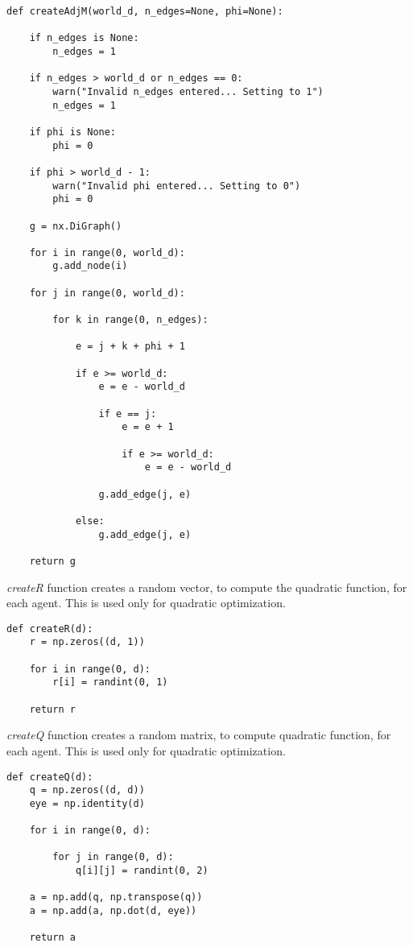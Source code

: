 \documentclass[a4paper,11pt,oneside]{book}
\begin{document}
\begin{lstlisting}
def createAdjM(world_d, n_edges=None, phi=None):

    if n_edges is None:
        n_edges = 1

    if n_edges > world_d or n_edges == 0:
        warn("Invalid n_edges entered... Setting to 1")
        n_edges = 1

    if phi is None:
        phi = 0

    if phi > world_d - 1:
        warn("Invalid phi entered... Setting to 0")
        phi = 0

    g = nx.DiGraph()

    for i in range(0, world_d):
        g.add_node(i)

    for j in range(0, world_d):

        for k in range(0, n_edges):

            e = j + k + phi + 1

            if e >= world_d:
                e = e - world_d

                if e == j:
                    e = e + 1

                    if e >= world_d:
                        e = e - world_d

                g.add_edge(j, e)

            else:
                g.add_edge(j, e)

    return g
\end{lstlisting}

\textit{createR} function creates a random vector, to compute the quadratic function, for each agent. This is used only for quadratic optimization.

\begin{lstlisting}
def createR(d):
    r = np.zeros((d, 1))

    for i in range(0, d):
        r[i] = randint(0, 1)

    return r
\end{lstlisting}

\textit{createQ} function creates a random matrix, to compute quadratic function, for each agent. This is used only for quadratic optimization.

\begin{lstlisting}
def createQ(d):
    q = np.zeros((d, d))
    eye = np.identity(d)

    for i in range(0, d):

        for j in range(0, d):
            q[i][j] = randint(0, 2)

    a = np.add(q, np.transpose(q))
    a = np.add(a, np.dot(d, eye))

    return a
\end{lstlisting}
\end{document}
